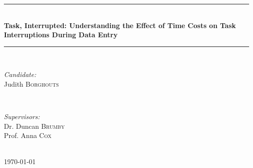 \begin{titlepage}

\newcommand{\HRule}{\rule{\linewidth}{0.5mm}} %

\center %



\HRule \\[0.4cm]
{\Large \bfseries Task, Interrupted: Understanding the Effect of Time Costs on Task Interruptions During Data Entry
}\\[0.4cm] %
\HRule \\[1.5cm]
 

\begin{minipage}{0.4\textwidth}
\begin{flushleft} \large
\emph{Candidate:}\\
Judith \textsc{Borghouts} %
\end{flushleft}
\end{minipage}
~
\begin{minipage}{0.4\textwidth}
\begin{flushright} \large
\emph{Supervisors:} \\
Dr. Duncan \textsc{Brumby} \\%
Prof. Anna \textsc{Cox}
\end{flushright}
\end{minipage}\\[4cm]





{\large \today}\\[3cm] %


\end{titlepage}
